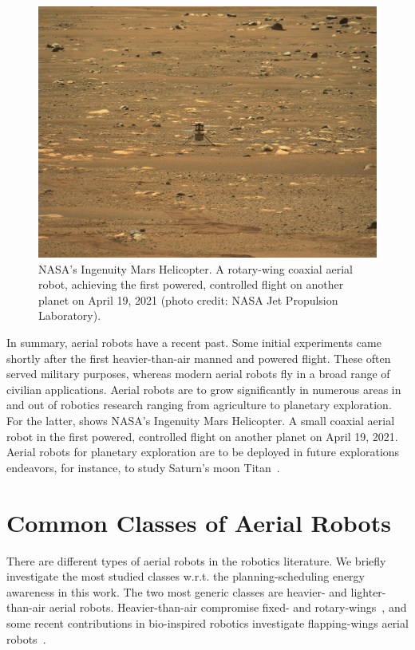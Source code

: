 \begin{figure}[t]
  \centering
  \includegraphics[width=.7\textwidth]{pictures/jpegPIA24550}
  \caption[NASA's Ingenuity Mars helicopter]{NASA's Ingenuity Mars Helicopter. A rotary-wing coaxial aerial robot, achieving the first powered, controlled flight on another planet on April 19, 2021 {\scriptsize(photo credit: NASA Jet Propulsion Laboratory)}.}   
  \label{fig:ingenuity}
\end{figure}
In summary, aerial robots have a recent past. Some initial experiments came shortly after the first heavier-than-air manned and powered flight. These often served military purposes, whereas modern aerial robots fly in a broad range of civilian applications. Aerial robots are to grow significantly in numerous areas in and out of robotics research ranging from agriculture to planetary exploration. For the latter,  shows NASA's Ingenuity Mars Helicopter. A small coaxial aerial robot in the first powered, controlled flight on another planet on April 19, 2021. Aerial robots for planetary exploration are to be deployed in future explorations endeavors, for instance, to study Saturn's moon Titan~\citep{voosen2019nasa}.


\section{Common Classes of Aerial Robots}
\label{sec:aerial-robo-types}

There are different types of aerial robots in the robotics literature. We briefly investigate the most studied classes w.r.t. the planning-scheduling energy awareness in this work. The two most generic classes are heavier- and lighter-than-air aerial robots. Heavier-than-air compromise fixed- and rotary-wings~\citep{siciliano2016springer}, and some recent contributions in bio-inspired robotics investigate flapping-wings aerial robots~\citep{floreano2015science}.


